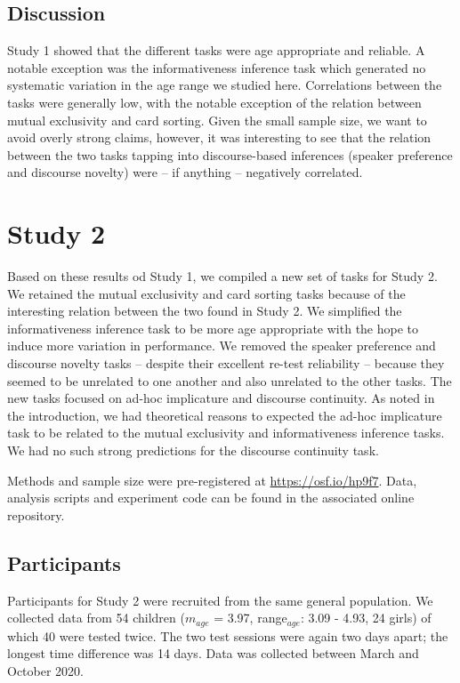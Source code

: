 \documentclass[
  man,floatsintext]{apa6}
\begin{document}
\hypertarget{discussion}{%
\subsection{Discussion}\label{discussion}}

Study 1 showed that the different tasks were age appropriate and reliable. A notable exception was the informativeness inference task which generated no systematic variation in the age range we studied here. Correlations between the tasks were generally low, with the notable exception of the relation between mutual exclusivity and card sorting. Given the small sample size, we want to avoid overly strong claims, however, it was interesting to see that the relation between the two tasks tapping into discourse-based inferences (speaker preference and discourse novelty) were -- if anything -- negatively correlated.

\hypertarget{study-2}{%
\section{Study 2}\label{study-2}}

Based on these results od Study 1, we compiled a new set of tasks for Study 2. We retained the mutual exclusivity and card sorting tasks because of the interesting relation between the two found in Study 2. We simplified the informativeness inference task to be more age appropriate with the hope to induce more variation in performance. We removed the speaker preference and discourse novelty tasks -- despite their excellent re-test reliability -- because they seemed to be unrelated to one another and also unrelated to the other tasks. The new tasks focused on ad-hoc implicature and discourse continuity. As noted in the introduction, we had theoretical reasons to expected the ad-hoc implicature task to be related to the mutual exclusivity and informativeness inference tasks. We had no such strong predictions for the discourse continuity task.

Methods and sample size were pre-registered at \url{https://osf.io/hp9f7}. Data, analysis scripts and experiment code can be found in the associated online repository.

\hypertarget{participants-1}{%
\subsection{Participants}\label{participants-1}}

Participants for Study 2 were recruited from the same general population. We collected data from 54 children (\(m_{age}\) = 3.97, range\(_{age}\): 3.09 - 4.93, 24 girls) of which 40 were tested twice. The two test sessions were again two days apart; the longest time difference was 14 days. Data was collected between March and October 2020.
\end{document}
